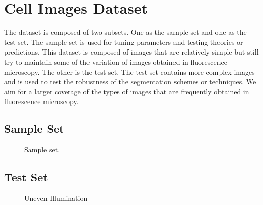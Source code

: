 
\chapter{Cell Images Dataset} %

\label{AppendixA} %

The dataset is composed of two subsets. One as the sample set and one as the test set. The sample set is used for tuning parameters and testing theories or predictions. This dataset is composed of images that are relatively simple but still try to maintain some of the variation of images obtained in fluorescence microscopy. The other is the test set. The test set contains more complex images and is used to test the robustness of the segmentation schemes or techniques. We aim for a larger coverage of the types of images that are frequently obtained in fluorescence microscopy.

\section{Sample Set}
\begin{figure}[!h]
	\centering
	\caption{Sample set.}
	\label{fig:sampleset}
\end{figure}

\clearpage
\section{Test Set}

\begin{figure}[!h]
	\centering
	\caption{Uneven Illumination}
	\label{fig:unevenillumination}
\end{figure}

